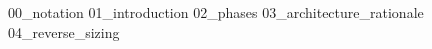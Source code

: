 {00_notation}
\pagebreak
{}
{01_introduction}
{02_phases}
{03_architecture_rationale}
{04_reverse_sizing}